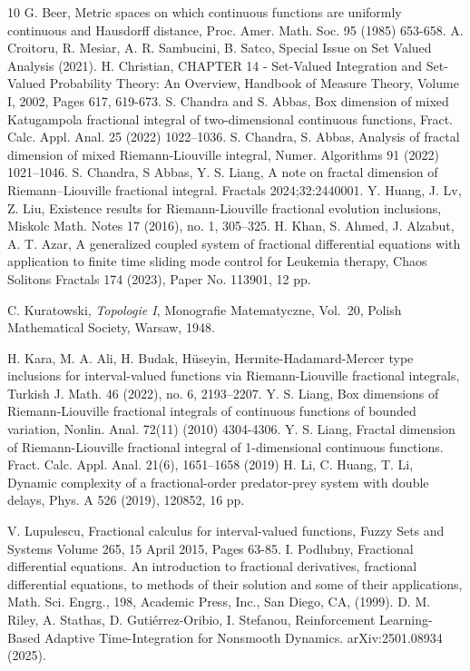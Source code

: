 \documentclass[a4paper,12pt,reqno]{amsart}
\numberwithin{equation}{section}
\theoremstyle{definition}
\theoremstyle{remark}
\numberwithin{equation}{section}
\begin{document}
\begin{thebibliography}{10}
 G. Beer, Metric spaces on which continuous functions are uniformly continuous and Hausdorff distance, Proc. Amer. Math. Soc. 95 (1985) 653-658.
 A. Croitoru, R. Mesiar, A. R. Sambucini, B. Satco, Special Issue on Set Valued Analysis (2021).
 H. Christian, CHAPTER 14 - Set-Valued Integration and Set-Valued Probability Theory: An Overview, Handbook of Measure Theory, Volume I, 2002, Pages 617, 619-673.
 S. Chandra and S. Abbas, Box dimension of mixed Katugampola fractional integral of two-dimensional
continuous functions, Fract. Calc. Appl. Anal. 25 (2022) 1022–1036.
 S. Chandra, S. Abbas, Analysis of fractal dimension of mixed Riemann-Liouville integral, Numer. Algorithms 91 (2022) 1021–1046.
 S. Chandra, S Abbas, Y. S. Liang, A note on fractal dimension of Riemann–Liouville fractional integral. Fractals 2024;32:2440001.
 Y. Huang, J. Lv, Z. Liu,  Existence results for Riemann-Liouville fractional evolution inclusions, Miskolc Math. Notes 17 (2016), no. 1, 305–325.
 H. Khan, S. Ahmed, J. Alzabut, A. T. Azar, A generalized coupled system of fractional differential equations with application to finite time sliding mode control for Leukemia therapy, Chaos Solitons Fractals 174 (2023), Paper No. 113901, 12 pp.

 C. Kuratowski, \emph{Topologie I}, Monografie Matematyczne, Vol.~20,
Polish Mathematical Society, Warsaw, 1948.

 H. Kara, M. A. Ali, H. Budak, Hüseyin, Hermite-Hadamard-Mercer type inclusions for interval-valued functions via Riemann-Liouville fractional integrals, Turkish J. Math. 46 (2022), no. 6, 2193–2207.
 Y. S. Liang, Box dimensions of Riemann-Liouville fractional integrals of continuous functions of bounded variation, Nonlin. Anal. 72(11) (2010) 4304-4306. 
 Y. S. Liang, Fractal dimension of Riemann-Liouville fractional integral of 1-dimensional continuous functions. Fract. Calc. Appl. Anal. 21(6), 1651–1658 (2019)
H. Li, C.  Huang, T. Li, Dynamic complexity of a fractional-order predator-prey system with double delays, Phys. A 526 (2019), 120852, 16 pp.
	
 V. Lupulescu, Fractional calculus for interval-valued functions,  Fuzzy Sets and Systems
Volume 265, 15 April 2015, Pages 63-85.
 I. Podlubny,  Fractional differential equations. An introduction to fractional derivatives, fractional differential equations, to methods of their solution and some of their applications, Math. Sci. Engrg., 198, Academic Press, Inc., San Diego, CA, (1999).
  D. M. Riley, A. Stathas, D. Gutiérrez-Oribio, I. Stefanou,  Reinforcement Learning-Based Adaptive Time-Integration for Nonsmooth Dynamics. arXiv:2501.08934 (2025).


\end{thebibliography}
\end{document}
